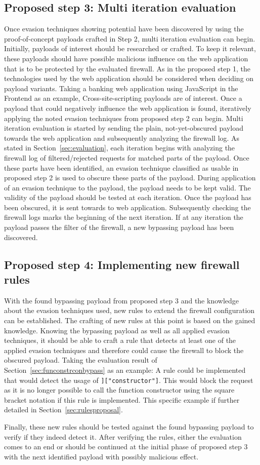 \subsection{Proposed step 3: Multi iteration evaluation}
Once evasion techniques showing potential have been discovered by using the proof-of-concept payloads crafted in Step 2, multi iteration evaluation can begin. Initially, payloads of interest should be researched or crafted. To keep it relevant, these payloads should have possible malicious influence on the web application that is to be protected by the evaluated firewall. As in the proposed step 1, the technologies used by the web application should be considered when deciding on payload variants. Taking a banking web application using JavaScript in the Frontend as an example, Cross-site-scripting payloads are of interest. Once a payload that could negatively influence the web application is found, iteratively applying the noted evasion techniques from proposed step 2 can begin. Multi iteration evaluation is started by sending the plain, not-yet-obscured payload towards the web application and subsequently analyzing the firewall log. As stated in Section~\ref{sec:evaluation}, each iteration begins with analyzing the firewall log of filtered/rejected requests for matched parts of the payload. Once these parts have been identified, an evasion technique classified as usable in proposed step 2 is used to obscure these parts of the payload. During application of an evasion technique to the payload, the payload needs to be kept valid. The validity of the payload should be tested at each iteration. Once the payload has been obscured, it is sent towards to web application. Subsequently checking the firewall logs marks the beginning of the next iteration. If at any iteration the payload passes the filter of the firewall, a new bypassing payload has been discovered.

\subsection{Proposed step 4: Implementing new firewall rules}
With the found bypassing payload from proposed step 3 and the knowledge about the evasion techniques used, new rules to extend the firewall configuration can be established. The crafting of new rules at this point is based on the gained knowledge. Knowing the bypassing payload as well as all applied evasion techniques, it should be able to craft a rule that detects at least one of the applied evasion techniques and therefore could cause the firewall to block the obscured payload. 
Taking the evaluation result of Section~\ref{sec:funconstrconbypass} as an example: A rule could be implemented that would detect the usage of \verb|]["constructor"]|. This would block the request as it is no longer possible to call the function constructor using the square bracket notation if this  rule is implemented. This specific example if further detailed in Section~\ref{sec:rulesproposal}.

Finally, these new rules should be tested against the found bypassing payload to verify if they indeed detect it. After verifying the rules, either the evaluation comes to an end or should be continued at the initial phase of proposed step 3 with the next identified payload with possibly malicious effect.
